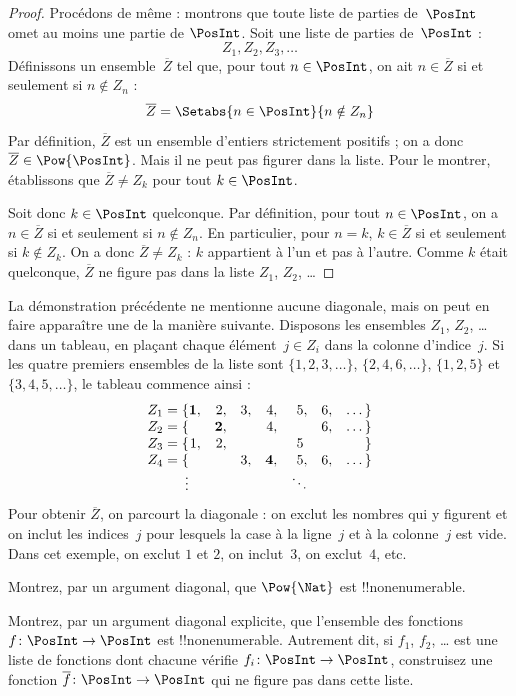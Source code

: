 \documentclass[../../../include/open-logic-section]{subfiles}
\begin{document}
\begin{proof}
Procédons de même : montrons que toute liste de parties
de~$\PosInt$ omet au moins une partie de $\PosInt$.
Soit une liste de parties de~$\PosInt$ :
\[
Z_{1}, Z_{2}, Z_{3}, \dots
\]
Définissons un ensemble~$\overline{Z}$ tel que, pour tout
$n \in \PosInt$, on ait $n \in \overline{Z}$ si et seulement si
$n \notin Z_{n}$ :
\[
\overline{Z} = \Setabs{n \in \PosInt}{n \notin Z_n}
\]
Par définition, $\overline{Z}$ est un ensemble d’entiers strictement
positifs ; on a donc $\overline{Z} \in \Pow{\PosInt}$.
Mais il ne peut pas figurer dans la liste. Pour le montrer,
établissons que $\overline{Z} \neq Z_k$ pour tout $k \in \PosInt$.

Soit donc $k \in \PosInt$ quelconque. Par définition,
pour tout $n \in \PosInt$, on a $n \in \overline{Z}$ si et seulement
si $n \notin Z_n$. En particulier, pour $n=k$,
$k \in \overline{Z}$ si et seulement si $k \notin Z_k$.
On a donc $\overline{Z} \neq Z_k$ :
$k$ appartient à l’un et pas à l’autre. Comme $k$ était quelconque,
$\overline{Z}$ ne figure pas dans la liste $Z_1$, $Z_2$, \dots
\end{proof}

\begin{explain}
La démonstration précédente ne mentionne aucune diagonale,
mais on peut en faire apparaître une de la manière suivante.
Disposons les ensembles $Z_1$, $Z_2$, \dots{} dans un tableau,
en plaçant chaque élément~$j \in Z_i$ dans la colonne d’indice~$j$.
Si les quatre premiers ensembles de la liste sont
$\{1,2,3,\dots\}$, $\{2, 4, 6, \dots\}$, $\{1,2,5\}$
et $\{3,4,5,\dots\}$, le tableau commence ainsi :
\[
\begin{array}{r@{}rrrrrrr}
  Z_1 = \{ & \mathbf{1}, & 2, & 3, & 4, & 5, & 6, & \dots\}\\
  Z_2 = \{ &  & \mathbf{2}, &  & 4, &  & 6, & \dots\}\\
  Z_3 = \{ & 1, & 2, &  &  & 5\phantom{,} &  & \}\\
  Z_4 = \{ &  &  & 3, & \mathbf{4}, & 5, & 6, & \dots\}\\
  \vdots & & & & & \ddots
\end{array}
\]
Pour obtenir $\overline{Z}$, on parcourt la diagonale : on exclut
les nombres qui y figurent et on inclut les indices~$j$ pour lesquels
la case à la ligne~$j$ et à la colonne~$j$ est vide. Dans cet exemple,
on exclut $1$ et $2$, on inclut~$3$, on exclut~$4$, etc.
\end{explain}

\begin{prob}
Montrez, par un argument diagonal, que $\Pow{\Nat}$ est !!{nonenumerable}.
\end{prob}

\begin{prob}\label{sfr:siz:nen:prob:f-posint}
Montrez, par un argument diagonal explicite, que l’ensemble
des fonctions $f \colon \PosInt \to \PosInt$ est !!{nonenumerable}.
Autrement dit, si $f_1$, $f_2$, \dots{} est une liste de fonctions
dont chacune vérifie $f_i\colon \PosInt \to \PosInt$, construisez
une fonction $\overline{f}\colon \PosInt \to \PosInt$ qui ne figure
pas dans cette liste.
\end{prob}
\end{document}
